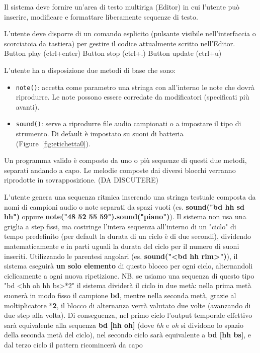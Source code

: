 \begin{description}[leftmargin=0.5cm, itemsep=0.8em]
    \item[RU1 (Editor di Codice):] Il sistema deve fornire un'area di testo multiriga (Editor) in cui l'utente può inserire, modificare e formattare liberamente sequenze di testo.

    \item[RU2 (Gestione Esecuzione):] L'utente deve disporre di un comando esplicito (pulsante visibile nell'interfaccia o scorciatoia da tastiera) per gestire il codice attualmente scritto nell'Editor.
        \subitem Button play (ctrl+enter)
        \subitem Button stop (ctrl+.)
        \subitem Button update (ctrl+u)


\item[RU11 (Sintassi base):] L'utente ha a disposizione due metodi di base che sono:
        \begin{itemize}
            \item \texttt{note()}: accetta come parametro una stringa con all'interno le note che dovrà riprodurre. Le note possono essere corredate da modificatori (specificati più avanti).
            \item \texttt{sound()}: serve a riprodurre file audio campionati o a impostare il tipo di strumento. Di default è impostato su suoni di batteria (Figure~\ref{fig:etichetta0}).
        \end{itemize}
    Un programma valido è composto da uno o più sequenze di questi due metodi, separati andando a capo. Le melodie composte dai diversi blocchi verranno riprodotte in sovrapposizione. (DA DISCUTERE)

    \item[RU12 (Sequenziamento Base):]
    L'utente genera una sequenza ritmica inserendo una stringa testuale composta da nomi di campioni audio o note separati da spazi vuoti (es. \textbf{sound("bd hh sd hh")} oppure \textbf{note("48 52 55 59").sound("piano")}).
    Il sistema non usa una griglia a step fissi, ma costringe l'intera sequenza all'interno di un "ciclo" di tempo predefinito (per default la durata di un ciclo è di due secondi), dividendo matematicamente e in parti uguali la durata del ciclo per il numero di suoni inseriti.
    Utilizzando le parentesi angolari (es. \textbf{sound("<bd hh rim>")}), il sistema eseguirà \textbf{un solo elemento} di questo blocco per ogni ciclo, alternandoli ciclicamente a ogni nuova ripetizione.
    NB. se usiamo una sequenza di questo tipo "bd <hh oh hh bs>*2" il sistema dividerà il ciclo in due metà: nella prima metà suonerà in modo fisso il campione \textbf{bd}, mentre nella seconda metà, grazie al moltiplicatore *\textbf{2}, il blocco di alternanza verrà valutato due volte (avanzando di due step alla volta). Di conseguenza, nel primo ciclo l'output temporale effettivo sarà equivalente alla sequenza \textbf{bd [hh oh]} (dove \textit{hh} e \textit{oh} si dividono lo spazio della seconda metà del ciclo), nel secondo ciclo sarà equivalente a \textbf{bd [hh bs]}, e dal terzo ciclo il pattern ricomincerà da capo



\end{description}
